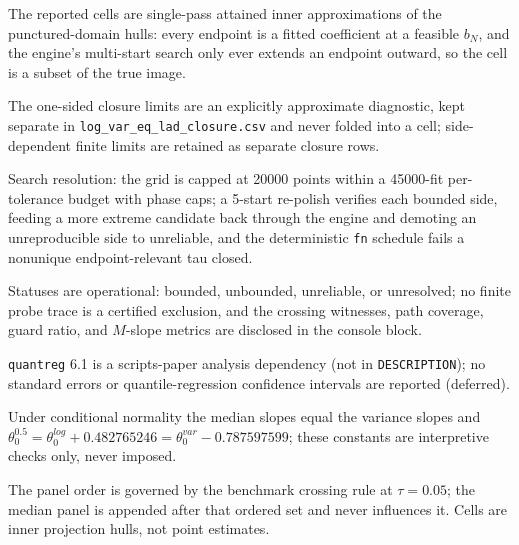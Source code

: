 \begin{table}[!htbp]
\begin{threeparttable}
\begin{tablenotes}[flushleft]
\item The reported cells are single-pass attained inner approximations of the punctured-domain hulls: every endpoint is a fitted coefficient at a feasible $b_N$, and the engine's multi-start search only ever extends an endpoint outward, so the cell is a subset of the true image.
\item The one-sided closure limits are an explicitly approximate diagnostic, kept separate in \texttt{log\_var\_eq\_lad\_closure.csv} and never folded into a cell; side-dependent finite limits are retained as separate closure rows.
\item Search resolution: the grid is capped at 20000 points within a 45000-fit per-tolerance budget with phase caps; a 5-start re-polish verifies each bounded side, feeding a more extreme candidate back through the engine and demoting an unreproducible side to unreliable, and the deterministic \texttt{fn} schedule fails a nonunique endpoint-relevant tau closed.
\item Statuses are operational: bounded, unbounded, unreliable, or unresolved; no finite probe trace is a certified exclusion, and the crossing witnesses, path coverage, guard ratio, and $M$-slope metrics are disclosed in the console block.
\item \texttt{quantreg} 6.1 is a scripts-paper analysis dependency (not in \texttt{DESCRIPTION}); no standard errors or quantile-regression confidence intervals are reported (deferred).
\item Under conditional normality the median slopes equal the variance slopes and $\theta^{0.5}_0 = \theta^{log}_0 + 0.482765246 = \theta^{var}_0 - 0.787597599$; these constants are interpretive checks only, never imposed.
\item The panel order is governed by the benchmark crossing rule at $\tau{=}0.05$; the median panel is appended after that ordered set and never influences it. Cells are inner projection hulls, not point estimates.
\end{tablenotes}
\end{threeparttable}
\end{table}
